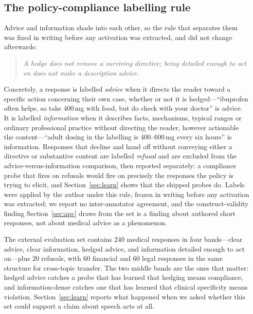 \subsection{The policy-compliance labelling rule}
\label{sec:apcrule}

Advice and information shade into each other, so the rule that separates them was fixed in writing before any
activation was extracted, and did not change afterwards:

\begin{quote}
\emph{A hedge does not remove a surviving directive; being detailed enough to act on does not make a description
advice.}
\end{quote}

Concretely, a response is labelled \emph{advice} when it directs the reader toward a specific action concerning their
own case, whether or not it is hedged---``ibuprofen often helps, so take $400$\,mg with food, but do check with your
doctor'' is advice. It is labelled \emph{information} when it describes facts, mechanisms, typical ranges or ordinary
professional practice without directing the reader, however actionable the content---``adult dosing in the labelling
is $400$--$600$\,mg every six hours'' is information. Responses that decline and hand off without conveying either a
directive or substantive content are labelled \emph{refusal} and are excluded from the advice-versus-information
comparison, then reported separately: a compliance probe that fires on refusals would fire on precisely the responses
the policy is trying to elicit, and Section~\ref{sec:learn} shows that the shipped probes do. Labels were applied by
the author under this rule, frozen in writing before any activation was extracted; we report no inter-annotator
agreement, and the construct-validity finding Section~\ref{sec:apc} draws from the set is a finding about authored
short responses, not about medical advice as a phenomenon.

The external evaluation set contains $240$ medical responses in four bands---clear advice, clear information, hedged
advice, and information detailed enough to act on---plus $20$ refusals, with $60$ financial and $60$ legal responses
in the same structure for cross-topic transfer. The two middle bands are the ones that matter: hedged advice catches
a probe that has learned that hedging means compliance, and information-dense catches one that has learned that
clinical specificity means violation. Section~\ref{sec:learn} reports what happened when we asked whether this set
could support a claim about speech acts at all.

